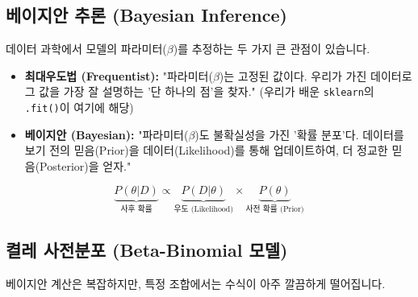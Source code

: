 \documentclass[11pt,a4paper]{book}
\theoremstyle{definition}
\begin{document}
\subsection{베이지안 추론 (Bayesian Inference)}

데이터 과학에서 모델의 파라미터($\beta$)를 추정하는 두 가지 큰 관점이 있습니다.

\begin{itemize}
    \item \textbf{최대우도법 (Frequentist):} "파라미터($\beta$)는 고정된 값이다. 우리가 가진 데이터로 그 값을 가장 잘 설명하는 '단 하나의 점'을 찾자." (우리가 배운 \texttt{sklearn}의 \texttt{.fit()}이 여기에 해당)
    \item \textbf{베이지안 (Bayesian):} "파라미터($\beta$)도 불확실성을 가진 '확률 분포'다. 데이터를 보기 전의 믿음(Prior)을 데이터(Likelihood)를 통해 업데이트하여, 더 정교한 믿음(Posterior)을 얻자."
\end{itemize}

$$ \underbrace{P(\theta | D)}_{\text{사후 확률}} \propto \underbrace{P(D | \theta)}_{\text{우도 (Likelihood)}} \times \underbrace{P(\theta)}_{\text{사전 확률 (Prior)}} $$

\subsection{켤레 사전분포 (Beta-Binomial 모델)}

베이지안 계산은 복잡하지만, 특정 조합에서는 수식이 아주 깔끔하게 떨어집니다.
\end{document}
